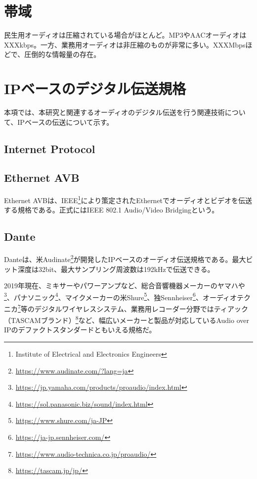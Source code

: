 \section{帯域}

民生用オーディオは圧縮されている場合がほとんど。MP3やAACオーディオはXXXkbps。一方、業務用オーディオは非圧縮のものが非常に多い。XXXMbpsほどで、圧倒的な情報量の存在。

\section{IPベースのデジタル伝送規格}

本項では、本研究と関連するオーディオのデジタル伝送を行う関連技術について、IPベースの伝送について示す。

\subsection{Internet Protocol}

\subsection{Ethernet AVB}

Ethernet AVBは、IEEE\footnote{Institute of Electrical and Electronics Engineers}により策定されたEthernetでオーディオとビデオを伝送する規格である。正式にはIEEE 802.1 Audio/Video Bridgingという。

\subsection{Dante}

Danteは、米Audinate\footnote{\url{https://www.audinate.com/?lang=ja}}が開発したIPベースのオーディオ伝送規格である。最大ビット深度は32bit、最大サンプリング周波数は192kHzで伝送できる\cite{best-practices-in-network-audio}。

2019年現在、ミキサーやパワーアンプなど、総合音響機器メーカーのヤマハや\footnote{\url{https://jp.yamaha.com/products/proaudio/index.html}}、パナソニック\footnote{\url{https://sol.panasonic.biz/sound/index.html}}、マイクメーカーの米Shure\footnote{\url{https://www.shure.com/ja-JP}}、独Sennheiser\footnote{\url{https://ja-jp.sennheiser.com/}}、オーディオテクニカ\footnote{\url{https://www.audio-technica.co.jp/proaudio/}}等のデジタルワイヤレスシステム、業務用レコーダー分野ではティアック（TASCAMブランド）\footnote{\url{https://tascam.jp/jp/}}など、幅広いメーカーと製品が対応しているAudio over IPのデファクトスタンダードともいえる規格だ。

